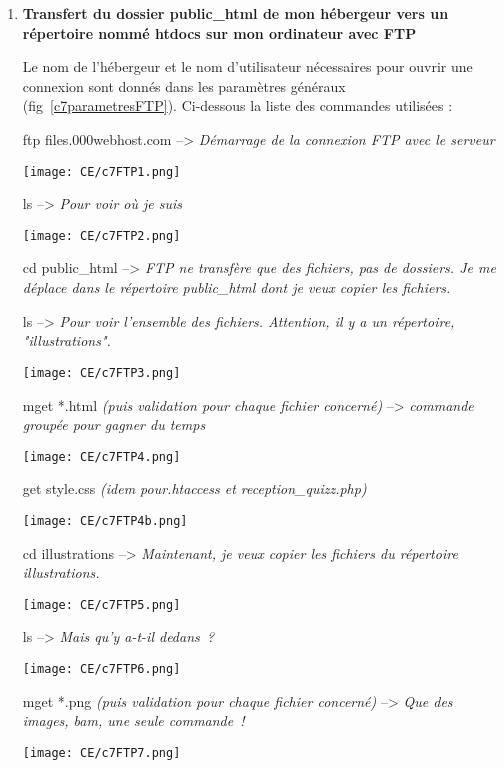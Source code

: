 \documentclass[11pt]{article}
\begin{document}
\begin{enumerate}

	\item \textbf{Transfert du dossier {\sffamily public\_html} de mon hébergeur vers un répertoire nommé {\sffamily htdocs} sur mon ordinateur avec FTP}
	
	Le nom de l’hébergeur et le nom d’utilisateur nécessaires pour ouvrir une connexion sont donnés dans les paramètres généraux (fig~\ref{c7parametresFTP}). Ci-dessous la liste des commandes utilisées :
	
	{\sffamily ftp files.000webhost.com} --> {\em Démarrage de la connexion FTP avec le serveur}

		\texttt{[image: CE/c7FTP1.png]}

	{\sffamily ls} --> {\em Pour voir où je suis}
	
		\texttt{[image: CE/c7FTP2.png]}

	{\sffamily cd public\_html} --> {\em FTP ne transfère que des fichiers, pas de dossiers. Je me déplace dans le répertoire {\sffamily public\_html} dont je veux copier les fichiers.}
	
	{\sffamily ls} --> {\em Pour voir l’ensemble des fichiers. Attention, il y a un répertoire, "illustrations".}
		
		\texttt{[image: CE/c7FTP3.png]}

	{\sffamily mget *.html} {\em (puis validation pour chaque fichier concerné)} --> {\em commande groupée pour gagner du temps}
			
		\texttt{[image: CE/c7FTP4.png]}

	{\sffamily get style.css} {\em (idem pour.htaccess et reception\_quizz.php)}
				
		\texttt{[image: CE/c7FTP4b.png]}

	{\sffamily cd illustrations} --> {\em Maintenant, je veux copier les fichiers du répertoire illustrations.}
				
		\texttt{[image: CE/c7FTP5.png]}

	{\sffamily ls} --> {\em Mais qu’y a-t-il dedans~?}
					
		\texttt{[image: CE/c7FTP6.png]}

	{\sffamily mget *.png} {\em (puis validation pour chaque fichier concerné)} --> {\em Que des images, bam, une seule commande~!}
						
		\texttt{[image: CE/c7FTP7.png]}


\end{enumerate}
\end{document}
